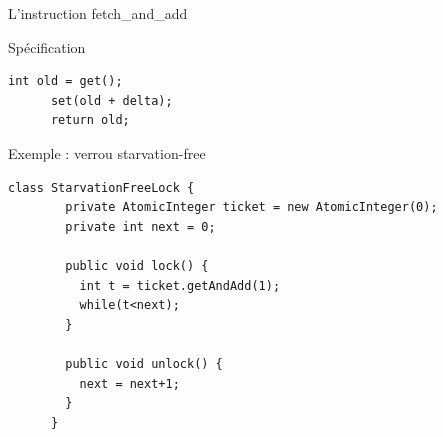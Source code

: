 
\begingroup

\begin{frame}[fragile]{L'instruction fetch\_and\_add}

  \begin{block}{Spécification}
    \begin{lstlisting}[gobble=6]
      int old = get();
      set(old + delta);
      return old;
    \end{lstlisting}
  \end{block}
  
  \begin{exampleblock}{Exemple : verrou starvation-free}
    \begin{lstlisting}[gobble=6]
      class StarvationFreeLock {
        private AtomicInteger ticket = new AtomicInteger(0);
        private int next = 0;
        
        public void lock() {
          int t = ticket.getAndAdd(1);
          while(t<next);
        }
        
        public void unlock() {
          next = next+1;
        }
      }
    \end{lstlisting}
  \end{exampleblock}


\end{frame}

\endgroup
\endinput
